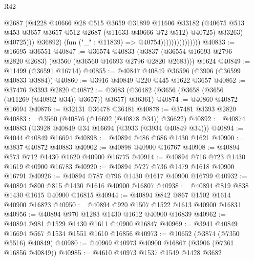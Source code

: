 \begin{lexlean}{R42}
\begin{coremodule}
                                        @2687
                                        (@4228
                                          @40666
                                          @28
                                          @515
                                          @3659
                                          @31899
                                          @11606
                                          @33182
                                          (@40675
                                            @513
                                            @453
                                            @3657
                                            @3657
                                            @512
                                            @2687
                                            (@11633 @40666 @72 @512)
                                            @40725)
                                          @33263)
                                        @40725)))
                                  @36892)
                                (fun ("_" : @11839) => @40754)))))))))))))))
@40833 := @16695 @36551
@40847 := @36574
    @40833
    (@3837 (@36554 @16693 @2796 @2820 @2683) (@3560 (@36560 @16693 @2796 @2820 @2683)))
    @1624
@40849 := @11499 (@36591 @16714)
@40855 := @40847 @40849 @36596 (@3906 (@36599 @40833 @3884))
@40860 := @3916 @40849 @220 @445 @1622 @3657
@40862 := @37476 @3393 @2820
@40872 := @3683 (@36482 (@3656 (@3658 (@3656 (@11269 (@40862 @34)) @3657)) @3657) @36361)
@40874 := @40860 @40872 @16694
@40876 := @32131 @36478 @36481
@40878 := @37481 @3393 @2820
@40883 := @3560 (@40876 (@16692 (@40878 @34)) @36622)
@40892 := @40874 @40883 (@3928 @40849 @34 @16694 (@3933 (@3934 @40849 @34)))
@40894 := @4044 @40849 @16694
@40898 := @40894 @486 @686 @1430 @1621
@40900 := @3837 @40872 @40883
@40902 := @40898 @40900 @16767
@40908 := @40894 @573 @712 @1430 @1620 @40900 @16775
@40914 := @40894 @716 @723 @1430 @1619 @40900 @16783
@40920 := @40894 @727 @736 @1479 @1618 @40900 @16791
@40926 := @40894 @787 @796 @1430 @1617 @40900 @16799
@40932 := @40894 @800 @815 @1430 @1616 @40900 @16807
@40938 := @40894 @819 @838 @1430 @1615 @40900 @16815
@40944 := @40894 @842 @867 @1502 @1614 @40900 @16823
@40950 := @40894 @920 @1507 @1522 @1613 @40900 @16831
@40956 := @40894 @970 @1283 @1430 @1612 @40900 @16839
@40962 := @40894 @981 @1529 @1430 @1611 @40900 @16847
@40969 := @3941 @40849 @16694 @567 @1534 @1551 @1610 @16856
@40973 := @10652 (@3874 (@7350 @5516) @40849)
@40980 := @40969 @40973 @40900 @16867 (@3906 (@7361 @16856 @40849))
@40985 := @4610 @40973 @1537 @1549 @1428 @3682

\end{coremodule}
\end{lexlean}
